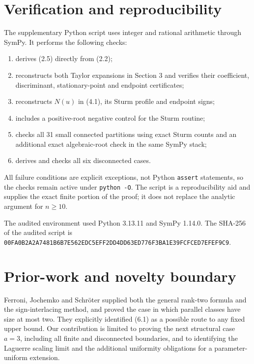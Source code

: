 \documentclass[11pt]{article}
\begin{document}
\section{Verification and reproducibility}


The supplementary Python script uses integer and rational arithmetic through
SymPy. It performs the following checks:

\begin{enumerate}
\item derives (2.5) directly from (2.2);
\item reconstructs both Taylor expansions in Section 3 and verifies their
coefficient, discriminant, stationary-point and endpoint certificates;
\item reconstructs $N(u)$ in (4.1), its Sturm profile and endpoint signs;
\item includes a positive-root negative control for the Sturm routine;
\item checks all 31 small connected partitions using exact Sturm counts and
an additional exact algebraic-root check in the same SymPy stack;
\item derives and checks all six disconnected cases.
\end{enumerate}

All failure conditions are explicit exceptions, not Python \texttt{assert}
statements, so the checks remain active under \texttt{python -O}. The script is a
reproducibility aid and supplies the exact finite portion of the proof; it
does not replace the analytic argument for $n\ge10$.

The audited environment used Python 3.13.11 and SymPy 1.14.0. The SHA-256 of
the audited script is
\texttt{00FA0B2A2A7481B6B7E562EDC5EFF2DD4DD63ED776F3BA1E39FCFCED7EFEF9C9}.

\section{Prior-work and novelty boundary}


Ferroni, Jochemko and Schröter \cite{fjs} supplied both the general rank-two formula
and the sign-interlacing method, and proved the case in which parallel classes
have size at most two. They explicitly identified (6.1) as a possible route
to any fixed upper bound. Our contribution is limited to proving the next
structural case $a=3$, including all finite and disconnected boundaries, and
to identifying the Laguerre scaling limit and the additional uniformity
obligations for a parameter-uniform extension.
\end{document}
